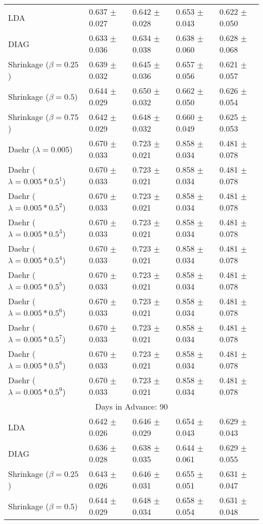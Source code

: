 \begin{table}
\begin{tabular}{*{5}{l}}
LDA&0.637 $\pm$ 0.027&0.642 $\pm$ 0.028&0.653 $\pm$ 0.043&0.622 $\pm$ 0.050\\
DIAG&0.633 $\pm$ 0.036&0.634 $\pm$ 0.038&0.638 $\pm$ 0.060&0.628 $\pm$ 0.068\\
Shrinkage ($\beta=0.25$)&0.639 $\pm$ 0.032&0.645 $\pm$ 0.036&0.657 $\pm$ 0.056&0.621 $\pm$ 0.057\\
Shrinkage ($\beta=0.5$)&0.644 $\pm$ 0.029&0.650 $\pm$ 0.032&0.662 $\pm$ 0.050&0.626 $\pm$ 0.054\\
Shrinkage ($\beta=0.75$)&0.642 $\pm$ 0.029&0.648 $\pm$ 0.032&0.660 $\pm$ 0.049&0.625 $\pm$ 0.053\\
Daehr ($\lambda=0.005$)&0.670 $\pm$ 0.033&0.723 $\pm$ 0.021&0.858 $\pm$ 0.034&0.481 $\pm$ 0.078\\
Daehr ($\lambda=0.005*0.5^1$)&0.670 $\pm$ 0.033&0.723 $\pm$ 0.021&0.858 $\pm$ 0.034&0.481 $\pm$ 0.078\\
Daehr ($\lambda=0.005*0.5^2$)&0.670 $\pm$ 0.033&0.723 $\pm$ 0.021&0.858 $\pm$ 0.034&0.481 $\pm$ 0.078\\
Daehr ($\lambda=0.005*0.5^3$)&0.670 $\pm$ 0.033&0.723 $\pm$ 0.021&0.858 $\pm$ 0.034&0.481 $\pm$ 0.078\\
Daehr ($\lambda=0.005*0.5^4$)&0.670 $\pm$ 0.033&0.723 $\pm$ 0.021&0.858 $\pm$ 0.034&0.481 $\pm$ 0.078\\
Daehr ($\lambda=0.005*0.5^5$)&0.670 $\pm$ 0.033&0.723 $\pm$ 0.021&0.858 $\pm$ 0.034&0.481 $\pm$ 0.078\\
Daehr ($\lambda=0.005*0.5^6$)&0.670 $\pm$ 0.033&0.723 $\pm$ 0.021&0.858 $\pm$ 0.034&0.481 $\pm$ 0.078\\
Daehr ($\lambda=0.005*0.5^7$)&0.670 $\pm$ 0.033&0.723 $\pm$ 0.021&0.858 $\pm$ 0.034&0.481 $\pm$ 0.078\\
Daehr ($\lambda=0.005*0.5^8$)&0.670 $\pm$ 0.033&0.723 $\pm$ 0.021&0.858 $\pm$ 0.034&0.481 $\pm$ 0.078\\
Daehr ($\lambda=0.005*0.5^9$)&0.670 $\pm$ 0.033&0.723 $\pm$ 0.021&0.858 $\pm$ 0.034&0.481 $\pm$ 0.078\\
\hline\multicolumn{5}{c}{  Days in Advance: 90}\\\hline
LDA&0.642 $\pm$ 0.026&0.646 $\pm$ 0.029&0.654 $\pm$ 0.043&0.629 $\pm$ 0.043\\
DIAG&0.636 $\pm$ 0.028&0.638 $\pm$ 0.035&0.644 $\pm$ 0.061&0.629 $\pm$ 0.055\\
Shrinkage ($\beta=0.25$)&0.643 $\pm$ 0.026&0.646 $\pm$ 0.031&0.655 $\pm$ 0.051&0.631 $\pm$ 0.047\\
Shrinkage ($\beta=0.5$)&0.644 $\pm$ 0.029&0.648 $\pm$ 0.034&0.658 $\pm$ 0.054&0.631 $\pm$ 0.048\\

\end{tabular}
\end{table}
